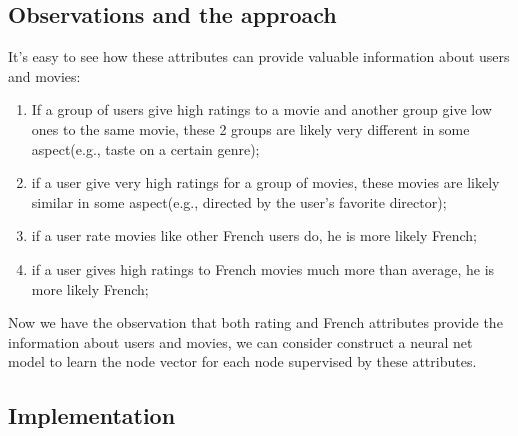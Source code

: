\documentclass{article}
\begin{document}
\subsection{Observations and the approach}
It's easy to see how these attributes can provide valuable information about users and movies: 
\begin{enumerate}
	\item If a group of users give high ratings to a movie and another group give low ones to the same movie, these 2 groups are likely very different in some aspect(e.g., taste on a certain genre);
	\item if a user give very high ratings for a group of movies, these movies are likely similar in some aspect(e.g., directed by the user's favorite director);
	\item if a user rate movies like other French users do, he is more likely French;
	\item if a user gives high ratings to French movies much more than average, he is more likely French;
\end{enumerate}
Now we have the observation that both rating and French attributes provide the information about users and movies, we can consider construct a neural net model to learn the node vector for each node supervised by these attributes.

\subsection{Implementation}
\end{document}
